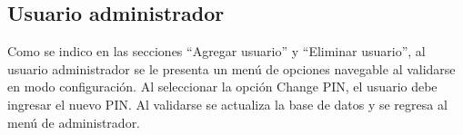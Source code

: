 \documentclass[10pt,a4paper]{article}
\begin{document}
\subsection{Usuario administrador}
Como se indico en las secciones ``Agregar usuario'' y ``Eliminar usuario'', al usuario administrador se le presenta un menú de opciones navegable al validarse en modo configuración. Al seleccionar la opción Change PIN, el usuario debe ingresar el nuevo PIN. Al validarse se actualiza la base de datos y se regresa al menú de administrador. 


\begin{comment}
\section{Pasos de acceso, interacción con el usuario}
En cualquier momento del intento de acceso se podrá pasar la tarjeta por el lector de tarjetas, lo cual autoriza el acceso inmediatamente.\par
El control de acceso se encuentra con el display apagado en su estado inicial/de reposo. Luego de un período de inactividad determinado, el control de acceso volverá al estado de reposo desde cualquier estado en el que se encuentre.\par
Para salir del estado de reposo, el usuario deberá dar un click corto en el encoder, luego de lo cual el display mostrará una pantalla llena de ceros y se deberá proceder a ingresar el ID (de ocho dígitos) del usuario que solicita el acceso. \par
Para el ingreso del ID, el dígito que se está completando estará parpadeando constantemente. El usuario podrá girar el encoder para elegir el número del dígito correspondiente y con un click corto podrá pasar a completar el siguiente dígito de su ID. Si se equivocó en el número, podrá mantener apretado al encoder para borrar el dígito anterior y volver a completarlo de la misma forma que se lo completó en el paso anterior. \par
Una vez completado el octavo (último) dígito del ID, una marquesina mostrará el ID completo para que el usuario lo confirme con un click corto. En caso de haberse equivocado, el usuario podrá hacer un click largo para volver a completar su ID.\par
Si el usuario está bloqueado, se volverá al estado inicial y se olvida el ID ingresado\par
Una vez confirmado el ID, si existe el usuario, se procede a completar el PIN. Inicialmente la pantalla estará completa con 'P', el primero de estos caracteres parpadeando. Se puede completar el PIN de cuatro o cinco dígitos de la misma manera que el ID, con la excepción de que el único carácter que se puede visualizar es el que se está completando, y el resto de los que ya se han completado aparecerán con el carácter 'P' en vez. \par

\end{comment}
\end{document}
